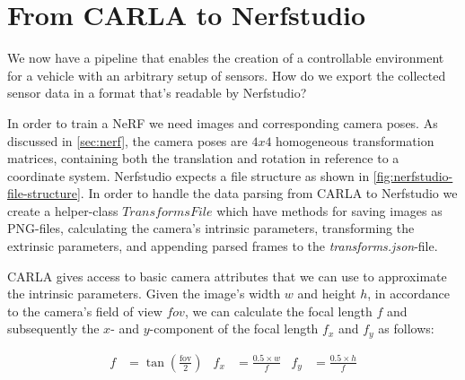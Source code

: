 \section{From CARLA to Nerfstudio} \label{sec:carla-to-nerfstudio}
\begin{comment}
Premise: Have collected data from CARLA.
Question: How do I get it from CARLA to Nerfstudio in a usable format?

\begin{itemize}
    \item Use the CARLA-simulator to find out which camera and vehicle settings work the best for capturing data for NeRFs.
    \item In order to do that I need to collect data from CARLA and convert it into a format that's usable by Nerfstudio.
\end{itemize}
\end{comment}

We now have a pipeline that enables the creation of a controllable environment for a vehicle with an arbitrary setup of sensors. How do we export the collected sensor data in a format that's readable by Nerfstudio?

In order to train a NeRF we need images and corresponding camera poses. As discussed in \autoref{sec:nerf}, the camera poses are $4x4$ homogeneous transformation matrices, containing both the translation and rotation in reference to a coordinate system. Nerfstudio expects a file structure as shown in \autoref{fig:nerfstudio-file-structure}. In order to handle the data parsing from CARLA to Nerfstudio we create a helper-class $TransformsFile$ which have methods for saving images as PNG-files, calculating the camera's intrinsic parameters, transforming the extrinsic parameters, and appending parsed frames to the \textit{transforms.json}-file.



CARLA gives access to basic camera attributes that we can use to approximate the intrinsic parameters. Given the image's width $w$ and height $h$, in accordance to the camera's field of view $fov$, we can calculate the focal length $f$ and subsequently the $x$- and $y$-component of the focal length $f_x$ and $f_y$ as follows:

\begin{align*}
f &= \tan\left(\frac{\text{fov}}{2}\right) &
f_x &= \frac{0.5 \times w}{f} &
f_y &= \frac{0.5 \times h}{f}
\end{align*}

